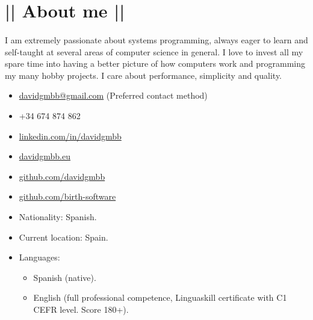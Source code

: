 \section*{|| About me ||}
\paragraph{}I am extremely passionate about systems programming, always eager to learn and self-taught at several areas of computer science in general. I love to invest all my spare time into having a better picture of how computers work and programming my many hobby projects. I care about performance, simplicity and quality.

\begin{itemize}
	\item[] \faEnvelope \space \href{mailto:davidgmbb@gmail.com}{davidgmbb@gmail.com} (Preferred contact method)
	\item[] \faPhone \space +34 674 874 862
	\item[] \faLinkedin \space \href{https://linkedin.com/in/davidglezmar94}{linkedin.com/in/davidgmbb}
	\item[] \faGlobe \space \href{https://davidgmbb.eu}{davidgmbb.eu}
	\item[] \faGithub \space \href{https://github.com/davidgmbb}{github.com/davidgmbb}
	\item[] \faGithub \space \href{https://github.com/birth-software}{github.com/birth-software}
	\item[] Nationality: Spanish.
	\item[] Current location: Spain.
	\item[] Languages:
	\begin{itemize}
		\item Spanish (native).
		\item English (full professional competence, Linguaskill certificate with C1 CEFR level. Score 180+).
	\end{itemize}
\end{itemize}

